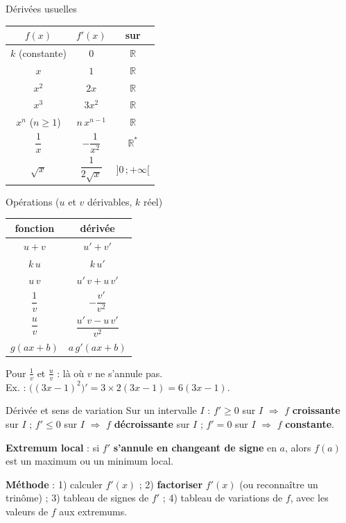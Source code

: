 \documentclass[11pt,a4paper]{article}
\newcommand{\R}{\mathbb{R}}
\begin{document}
\medskip
\begin{minipage}[t]{0.44\linewidth}
\vspace{0pt}
\begin{cours}{Dérivées usuelles}
\centering
\begin{tabular}{ccc}
$f(x)$ & $f'(x)$ & sur \\ \midrule
$k$ (constante) & $0$ & $\R$ \\
$x$ & $1$ & $\R$ \\
$x^2$ & $2x$ & $\R$ \\
$x^3$ & $3x^2$ & $\R$ \\
$x^n$ ($n \geq 1$) & $n\,x^{n-1}$ & $\R$ \\
$\dfrac{1}{x}$ & $-\dfrac{1}{x^2}$ & $\R^*$ \\[8pt]
$\sqrt{x}$ & $\dfrac{1}{2\sqrt{x}}$ & $]0\,;+\infty[$
\end{tabular}
\end{cours}
\end{minipage}\hfill
\begin{minipage}[t]{0.53\linewidth}
\vspace{0pt}
\begin{cours}{Opérations ($u$ et $v$ dérivables, $k$ réel)}
\centering
\begin{tabular}{cc}
fonction & dérivée \\ \midrule
$u + v$ & $u' + v'$ \\
$k\,u$ & $k\,u'$ \\
$u\,v$ & $u'\,v + u\,v'$ \\
$\dfrac{1}{v}$ & $-\dfrac{v'}{v^2}$ \\[8pt]
$\dfrac{u}{v}$ & $\dfrac{u'\,v - u\,v'}{v^2}$ \\[8pt]
$g(ax+b)$ & $a\,g'(ax+b)$
\end{tabular}

\smallskip
\raggedright\small Pour $\frac{1}{v}$ et $\frac{u}{v}$ : là où $v$ ne s'annule pas.\\
Ex. : $\big((3x-1)^2\big)' = 3 \times 2(3x-1) = 6(3x-1)$.
\end{cours}
\end{minipage}

\medskip
\begin{cours}{Dérivée et sens de variation}
Sur un intervalle $I$ :
$f' \geq 0$ sur $I$ $\Rightarrow$ $f$ \textbf{croissante} sur $I$ ;\quad
$f' \leq 0$ sur $I$ $\Rightarrow$ $f$ \textbf{décroissante} sur $I$ ;\quad
$f' = 0$ sur $I$ $\Rightarrow$ $f$ \textbf{constante}.

\textbf{Extremum local} : si $f'$ \textbf{s'annule en changeant de signe} en $a$, alors $f(a)$ est un maximum ou un minimum local.

\textbf{Méthode} : 1) calculer $f'(x)$ ; 2) \textbf{factoriser} $f'(x)$ (ou reconnaître un trinôme) ; 3) tableau de signes de $f'$ ; 4) tableau de variations de $f$, avec les valeurs de $f$ aux extremums.
\end{cours}
\end{document}
